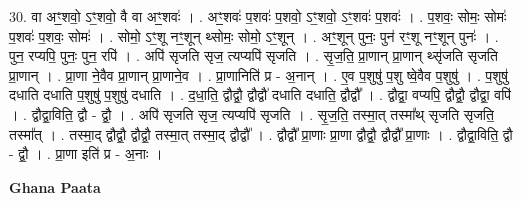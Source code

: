 \documentclass[17pt]{extarticle}
\begin{document}
30. वा अꣳ॒॒शवो॒ ऽꣳ॒शवो॒ वै वा अꣳ॒॒शवः॑ । . अꣳ॒॒शवः॑ प॒शवः॑ प॒शवो॒ ऽꣳ॒शवो॒ ऽꣳ॒शवः॑ प॒शवः॑ । . प॒शवः॒ सोमः॒ सोमः॑ प॒शवः॑ प॒शवः॒ सोमः॑ । . सोमो॒ ऽꣳ॒शू नꣳ॒॒शून् थ्सोमः॒ सोमो॒ ऽꣳ॒शून् । . अꣳ॒॒शून् पुनः॒ पुन॑ रꣳ॒॒शू नꣳ॒॒शून् पुनः॑ । . पुन॒ रप्यपि॒ पुनः॒ पुन॒ रपि॑ । . अपि॑ सृजति सृज॒ त्यप्यपि॑ सृजति । . सृ॒ज॒ति॒ प्रा॒णान् प्रा॒णान् थ्सृ॑जति सृजति प्रा॒णान् । . प्रा॒णा ने॒वैव प्रा॒णान् प्रा॒णाने॒व । . प्रा॒णानिति॑ प्र - अ॒नान् । . ए॒व प॒शुषु॑ प॒शु ष्वे॒वैव प॒शुषु॑ । . प॒शुषु॑ दधाति दधाति प॒शुषु॑ प॒शुषु॑ दधाति । . द॒धा॒ति॒ द्वौद्वौ॒ द्वौद्वौ॑ दधाति दधाति॒ द्वौद्वौ᳚ । . द्वौद्वा॒ वप्यपि॒ द्वौद्वौ॒ द्वौद्वा॒ वपि॑ । . द्वौद्वा॒विति॒ द्वौ - द्वौ॒ । . अपि॑ सृजति सृज॒ त्यप्यपि॑ सृजति । . सृ॒ज॒ति॒ तस्मा॒त् तस्मा᳚थ् सृजति सृजति॒ तस्मा᳚त् । . तस्मा॒द् द्वौद्वौ॒ द्वौद्वौ॒ तस्मा॒त् तस्मा॒द् द्वौद्वौ᳚ । . द्वौद्वौ᳚ प्रा॒णाः प्रा॒णा द्वौद्वौ॒ द्वौद्वौ᳚ प्रा॒णाः । . द्वौद्वा॒विति॒ द्वौ - द्वौ॒ । . प्रा॒णा इति॑ प्र - अ॒नाः । \newline

\textbf{Ghana Paata } \newline
\end{document}
